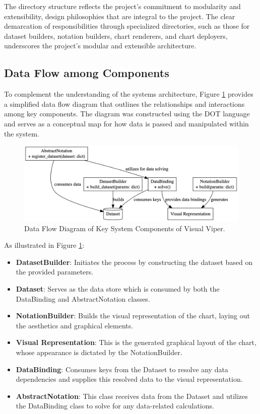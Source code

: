 The directory structure reflects the project's commitment to modularity
and extensibility, design philosophies that are integral to the project.
The clear demarcation of responsibilities through specialized
directories, such as those for dataset builders, notation builders,
chart renderers, and chart deployers, underscores the project's modular
and extensible architecture.

\subsection{Data Flow among
Components}\label{data-flow-among-components}

To complement the understanding of the system\textquotesingle s
architecture, Figure \ref{fig:data_flow} provides a simplified data flow diagram that
outlines the relationships and interactions among key components. The
diagram was constructed using the DOT language and serves as a
conceptual map for how data is passed and manipulated within the system.

\begin{figure}[ht]
  \centering
  \includegraphics[width=\textwidth]{media/fig11.png}
  \caption{Data Flow Diagram of Key System Components of Visual Viper.}
  \label{fig:data_flow}
\end{figure}

As illustrated in Figure \ref{fig:data_flow}:

\begin{itemize}
\item
  \textbf{DatasetBuilder}: Initiates the process by constructing the
  dataset based on the provided parameters.
\item
  \textbf{Dataset}: Serves as the data store which is consumed by both
  the DataBinding and AbstractNotation classes.
\item
  \textbf{NotationBuilder}: Builds the visual representation of the
  chart, laying out the aesthetics and graphical elements.
\item
  \textbf{Visual Representation}: This is the generated graphical layout
  of the chart, whose appearance is dictated by the NotationBuilder.
\item
  \textbf{DataBinding}: Consumes keys from the Dataset to resolve any
  data dependencies and supplies this resolved data to the visual
  representation.
\item
  \textbf{AbstractNotation}: This class receives data from the Dataset
  and utilizes the DataBinding class to solve for any data-related
  calculations.
\end{itemize}

